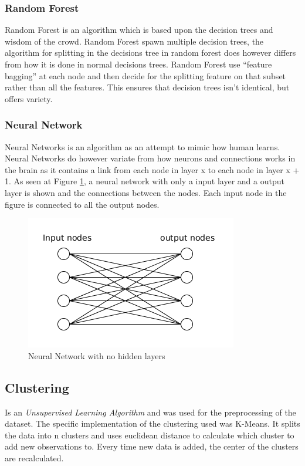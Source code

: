\subsubsection{Random Forest}
Random Forest is an algorithm which is based upon the decision trees and wisdom of the crowd.
Random Forest spawn multiple decision trees, the algorithm for splitting in the decisions tree in random forest does however differs from how it is done in normal decisions trees.
Random Forest use ``feature bagging'' at each node and then decide for the splitting feature on that subset rather than all the features. This ensures that decision trees isn't identical, but offers variety.

\subsubsection{Neural Network}
Neural Networks is an algorithm as an attempt to mimic how human learns.
Neural Networks do however variate from how neurons and connections works in the brain as it contains a link from each node in layer x to each node in layer x + 1. As seen at Figure \ref{fig:neuralnetwork}, a neural network with only a input layer and a output layer is shown and the connections between the nodes. Each input node in the figure is connected to all the output nodes.

\begin{figure}
  \centering
  \includegraphics[width=0.7\linewidth]{Images/neuralnetwork}
  \caption{Neural Network with no hidden layers}
  \label{fig:neuralnetwork}
\end{figure}

\subsection{Clustering}
Is an \emph{Unsupervised Learning Algorithm} and was used for the preprocessing of the dataset. The specific implementation of the clustering used was K-Means. It splits the data into n clusters and uses euclidean distance to calculate which cluster to add new observations to. Every time new data is added, the center of the clusters are recalculated.